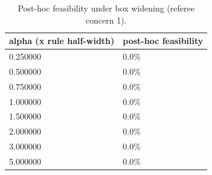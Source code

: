 \begin{table}
\caption{Post-hoc feasibility under box widening (referee concern 1).}
\label{tab:rev_tight}
\begin{tabular}{ll}
\toprule
alpha (x rule half-width) & post-hoc feasibility \\
\midrule
0.250000 & 0.0\% \\
0.500000 & 0.0\% \\
0.750000 & 0.0\% \\
1.000000 & 0.0\% \\
1.500000 & 0.0\% \\
2.000000 & 0.0\% \\
3.000000 & 0.0\% \\
5.000000 & 0.0\% \\
\bottomrule
\end{tabular}
\end{table}
